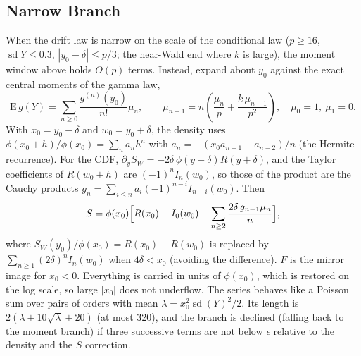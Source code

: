 \documentclass[12pt]{article}
\newcommand{\phiN}{\phi}
\begin{document}
\subsection{Narrow Branch}
When the drift law is narrow on the scale of the conditional law ($p\ge16$, $\operatorname{sd}Y\le0.3$, $|y_0-\delta|\le p/3$; the near-Wald end where $k$ is large), the moment window above holds $O(p)$ terms. Instead, expand about $y_0$ against the exact central moments of the gamma law,
\begin{equation}
  \mathrm E\,g(Y)=\sum_{n\ge0}\frac{g^{(n)}(y_0)}{n!}\mu_n,\qquad
  \mu_{n+1}=n\left(\frac{\mu_n}{p}+\frac{k\,\mu_{n-1}}{p^2}\right),\quad \mu_0=1,\ \mu_1=0.
\end{equation}
With $x_0=y_0-\delta$ and $w_0=y_0+\delta$, the density uses $\phiN(x_0+h)/\phiN(x_0)=\sum_na_nh^n$ with $a_n=-(x_0a_{n-1}+a_{n-2})/n$ (the Hermite recurrence). For the CDF, $\partial_yS_W=-2\delta\,\phiN(y-\delta)R(y+\delta)$, and the Taylor coefficients of $R(w_0+h)$ are $(-1)^nI_n(w_0)$, so those of the product are the Cauchy products $g_n=\sum_{i\le n}a_i(-1)^{n-i}I_{n-i}(w_0)$. Then
\begin{equation}
  S=\phiN(x_0)\Bigl[R(x_0)-I_0(w_0)-\sum_{n\ge2}\frac{2\delta\,g_{n-1}\mu_n}{n}\Bigr],
\end{equation}
where $S_W(y_0)/\phiN(x_0)=R(x_0)-R(w_0)$ is replaced by $\sum_{n\ge1}(2\delta)^nI_n(w_0)$ when $4\delta<x_0$ (avoiding the difference). $F$ is the mirror image for $x_0<0$. Everything is carried in units of $\phiN(x_0)$, which is restored on the log scale, so large $|x_0|$ does not underflow. The series behaves like a Poisson sum over pairs of orders with mean $\lambda=x_0^2\operatorname{sd}(Y)^2/2$. Its length is $2(\lambda+10\sqrt\lambda+20)$ (at most 320), and the branch is declined (falling back to the moment branch) if three successive terms are not below $\epsilon$ relative to the density and the $S$ correction.
\end{document}
